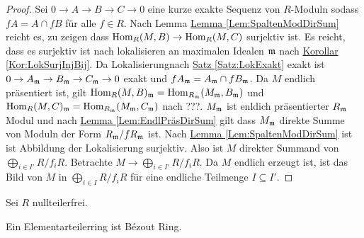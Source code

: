 \begin{proof}
    Sei \(0\to A\to B\to C\to 0\) eine kurze exakte Sequenz von \(R\)-Moduln sodass \(fA=A\cap fB\) für alle \(f\in R\). Nach Lemma \hyperref[Lem:SpaltenModDirSum]{Lemma \ref{Lem:SpaltenModDirSum}} reicht es, zu zeigen dass \(\operatorname{Hom}_R(M,B)\to \operatorname{Hom}_R(M,C)\) surjektiv ist. Es reicht, dass es surjektiv ist nach lokalisieren an maximalen Idealen \(\mathfrak{m}\) nach \hyperref[Kor:LokSurjInjBij]{Korollar \ref{Kor:LokSurjInjBij}}. Da Lokalisierungnach \hyperref[Satz:LokExakt]{Satz \ref{Satz:LokExakt}} exakt ist \(0\to A_{\mathfrak{m}}\to B_{\mathfrak{m}}\to C_{\mathfrak{m}}\to 0\) exakt und \(fA_{\mathfrak{m}}=A_{\mathfrak{m}}\cap fB_{\mathfrak{m}}\).
    Da \(M\) endlich präsentiert ist, gilt \(\operatorname{Hom}_R(M,B)_{\mathfrak{m}}=\operatorname{Hom}_{R_{\mathfrak{m}}}(M_{\mathfrak{m}},B_{\mathfrak{m}})\) und \(\operatorname{Hom}_R(M,C)_{\mathfrak{m}}=\operatorname{Hom}_{R_{\mathfrak{m}}}(M_{\mathfrak{m}},C_{\mathfrak{m}})\) nach ???. \(M_{\mathfrak{m}}\) ist enldich präsentierter \(R_{\mathfrak{m}}\) Modul und nach \hyperref[Lem:EndlPräsDirSum]{Lemma \ref{Lem:EndlPräsDirSum}} gilt dass \(M_{\mathfrak{m}}\) direkte Summe von Moduln der Form \(R_{\mathfrak{m}}/fR_{\mathfrak{m}}\) ist. Nach \hyperref[Lem:SpaltenModDirSum]{Lemma \ref{Lem:SpaltenModDirSum}} ist ist Abbildung der Lokalisierung surjektiv. Also ist \(M\) direkter Summand von \(\bigoplus_{i\in I'}R/f_iR\). Betrachte \(M\to\bigoplus_{i\in I'}R/f_iR\). Da \(M\) endlich erzeugt ist, ist das Bild von \(M\) in \(\bigoplus_{i\in I}R/f_iR\) für eine endliche Teilmenge \(I\subseteq I'\).
\end{proof}
\begin{Def}
    Sei \(R\) nullteilerfrei.
\end{Def}
\begin{Lemma}
    Ein Elementarteilerring ist Bézout Ring.
\end{Lemma}
